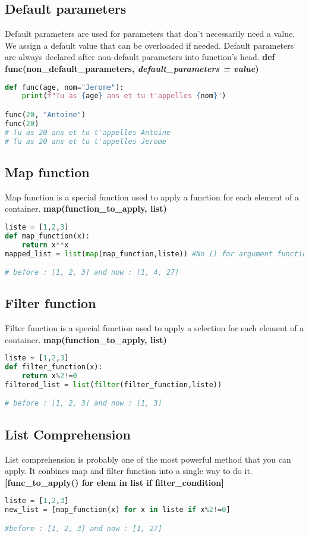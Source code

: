 \documentclass[a4paper, 12pt]{article}
\begin{document}
\subsection{Default parameters}
Default parameters are used for parameters that don't necessarily need a value. We assign a default value that can be overloaded if needed. Default parameters are always declared after non-default parameters into function's head. \textbf{def func(non\_default\_parameters, \textit{default\_parameters = value})}

\begin{lstlisting}[language=Python]
def func(age, nom="Jerome"):
	print(f"Tu as {age} ans et tu t'appelles {nom}")

func(20, "Antoine")
func(20)
# Tu as 20 ans et tu t'appelles Antoine
# Tu as 20 ans et tu t'appelles Jerome

\end{lstlisting}

\subsection{Map function}
Map function is a special function used to apply a function for each element of a container. \textbf{map(function\_to\_apply, list)}
\begin{lstlisting}[language=Python]
liste = [1,2,3]
def map_function(x):
	return x**x
mapped_list = list(map(map_function,liste)) #No () for argument function

# before : [1, 2, 3] and now : [1, 4, 27]
\end{lstlisting}

\subsection{Filter function}
Filter function is a special function used to apply a selection for each element of a container. \textbf{map(function\_to\_apply, list)}
\begin{lstlisting}[language=Python]
liste = [1,2,3]
def filter_function(x):
	return x%2!=0
filtered_list = list(filter(filter_function,liste))

# before : [1, 2, 3] and now : [1, 3]
\end{lstlisting}

\subsection{List Comprehension}
List comprehension is probably one of the most powerful method that you can apply. It conbines map and filter function into a single way to do it. \textbf{[func\_to\_apply() for elem in list if filter\_condition]}
\label{subsec:ListComprehension}
\begin{lstlisting}[language=Python]
liste = [1,2,3]
new_list = [map_function(x) for x in liste if x%2!=0]

#before : [1, 2, 3] and now : [1, 27]
\end{lstlisting}
\end{document}
